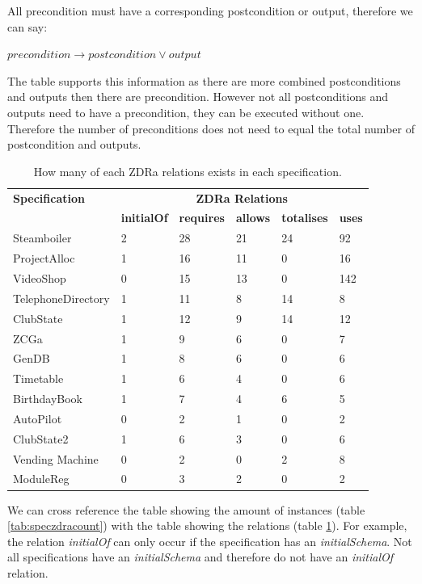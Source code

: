 All precondition must have a corresponding postcondition or output, therefore we
can say:

\begin{lemma}
$precondition \longrightarrow postcondition \lor output$
\end{lemma}

The table supports this information as there are more combined postconditions and
outputs then there are precondition. However not all postconditions and outputs
need to have a precondition, they can be executed without one. Therefore the
number of preconditions does not need to equal the total number of postcondition
and outputs.

\begin{table}[H]
\begin{tabular}{|l |l | l |l | l| l |}
\hline
\textbf{Specification} & \multicolumn{5}{c|}{\textbf{ZDRa Relations}}\\
\cline{2-6}
 & \textbf{initialOf} & \textbf{requires} & \textbf{allows} & \textbf{totalises}
 & \textbf{uses} \\
\hline
Steamboiler & 2 & 28 & 21 & 24 & 92  \\
ProjectAlloc & 1 & 16 & 11 & 0 & 16  \\
VideoShop  & 0 & 15 & 13 & 0 & 142  \\
TelephoneDirectory &  1 & 11 & 8 & 14 & 8 \\
ClubState &  1 & 12 & 9 & 14 & 12  \\
ZCGa & 1 & 9 & 6 & 0 & 7  \\
GenDB & 1 & 8 & 6 & 0 & 6  \\
Timetable & 1 & 6 & 4 & 0 & 6  \\
BirthdayBook & 1 & 7 & 4 & 6 & 5  \\
AutoPilot & 0 & 2 & 1 & 0 & 2 \\
ClubState2 & 1 & 6 & 3 & 0 & 6 \\
Vending Machine & 0 & 2 & 0 & 2 & 8  \\
ModuleReg & 0 & 3 & 2 & 0 & 2  \\
\hline
\end{tabular}
\caption{How many of each ZDRa relations exists in each specification. \label{tab:speczdrarelationscount}}
\end{table}

We can cross reference the table showing the amount of instances (table
\ref{tab:speczdracount}) with the table showing the relations (table
\ref{tab:speczdrarelationscount}). For example, the relation \emph{initialOf}
can only occur if the specification has an \emph{initialSchema}. Not all
specifications have an \emph{initialSchema} and therefore do not have an
\emph{initialOf} relation.

